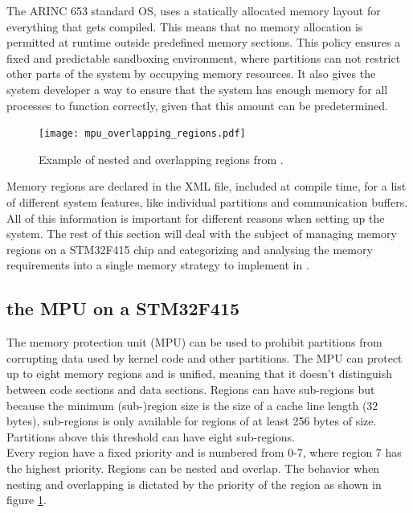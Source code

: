 The ARINC 653 standard OS, uses a statically allocated memory layout for everything that gets compiled.
This means that no memory allocation is permitted at runtime
outside predefined memory sections.
This policy ensures a fixed and predictable sandboxing environment, where partitions can not restrict other parts of the system by occupying memory resources.
It also gives the system developer a way to ensure that the system has enough memory for all processes to function correctly, given that this amount can be predetermined.

\begin{figure}
	\vspace{-20pt}
	\centering
	\texttt{[image: mpu\_overlapping\_regions.pdf]}
	\caption{Example of nested and overlapping regions from \cite{stm32_mpu}.}
	\label{fig:stm32_mpu}
	\vspace{-40pt}
\end{figure}

Memory regions are declared in the XML file, included at compile time, for a list of different system features, like individual partitions and communication buffers.
All of this information is important for different reasons when setting up the system.
The rest of this section will deal with the subject of managing memory regions on a STM32F415 chip and categorizing and analysing the memory requirements into a single memory strategy to implement in .

\subsection{the MPU on a STM32F415}
\label{ssec:design_mpu}
The memory protection unit (MPU) can be used to prohibit partitions from corrupting data used by kernel code and other partitions.
The MPU can protect up to eight memory regions and is unified, meaning that it doesn't distinguish between code sections and data sections.
Regions can have sub-regions but because the minimum (sub-)region size is the size of a cache line length (32 bytes), sub-regions is only available for regions of at least 256 bytes of size.
Partitions above this threshold can have eight sub-regions.\\

Every region have a fixed priority and is numbered from 0-7, where region 7 has the highest priority.
Regions can be nested and overlap.
The behavior when nesting and overlapping is dictated by the priority of the region as shown in figure \ref{fig:stm32_mpu}.

